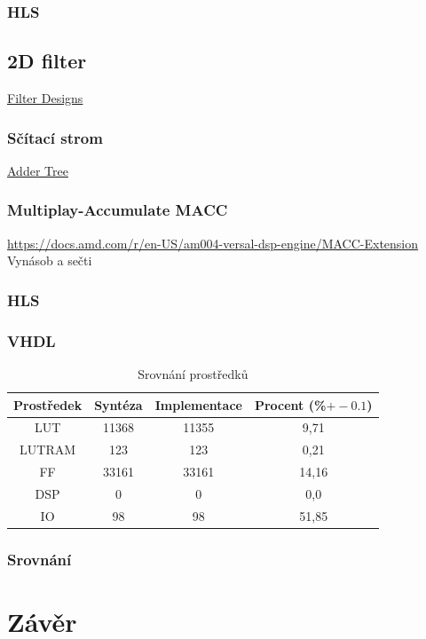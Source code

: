 \subsection{HLS}

\section{2D filter}

\href{https://docs.amd.com/r/en-US/am004-versal-dsp-engine/Filter-Designs}{Filter Designs
}
\subsection{Sčítací strom}
\href{https://docs.amd.com/r/en-US/am004-versal-dsp-engine/Adder-Tree}{Adder Tree }

\subsection{Multiplay-Accumulate MACC }
\href{https://docs.amd.com/r/en-US/am004-versal-dsp-engine/MACC-Extension}{https://docs.amd.com/r/en-US/am004-versal-dsp-engine/MACC-Extension}
Vynásob a sečti

\subsection{HLS}
\subsection{VHDL}

\begin{table}[!h]
    \centering
    \begin{tabular}{cccc}
        Prostředek& Syntéza& Implementace& Procent (\%\(+-0.1\))\\\midrule
        LUT &  11368 & 11355 & 9,71 \\
        LUTRAM& 123 & 123 & 0,21 \\
        FF& 33161 & 33161 & 14,16\\
        DSP& 0 & 0 & 0,0\\
        IO& 98 & 98 & 51,85\\ \bottomrule
    \end{tabular}
    \caption{Srovnání prostředků}
    \label{tab:filter_2d}
\end{table}

 \subsection{Srovnání}

 
\chapter{Závěr}

\printbibliography[title={Použitá literatura},heading=bibintoc]

